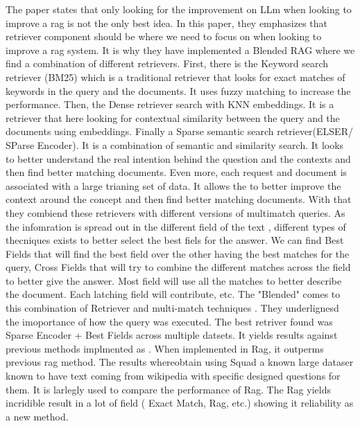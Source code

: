 The paper states that only looking for the improvement on LLm when looking to improve a rag is not the only best idea. In this paper, they emphasizes that retriever component should be where we need to
focus on when looking to improve a rag system. It is why they have implemented a Blended RAG where we find a combination of different retrievers. First, there is the Keyword search retriever (BM25) which 
is a traditional retriever that looks for exact matches of keywords in the query and the documents. It uses fuzzy matching to increase the performance. Then, the Dense retriever search with KNN embeddings. 
It is a retriever that here looking for contextual similarity between the query and the documents using embeddings. Finally a Sparse semantic search retriever(ELSER/ SParse Encoder). It is a combination of
semantic and similarity search. It looks to better understand the real intention behind the question and the contexts and then find better matching documents. Even more, each request and document is associated
with a large trianing set of data. It allows the to better improve the context around the concept and then find better matching documents. With that they combiend these retrievers with different versions of 
multimatch queries. As the infomration is spread out in the different field of the text , different types of thecniques exists to better select the best fiels for the answer. We can find Best Fields that will
find the best field over the other having the best matches for the query, Cross Fields that will try to combine the different matches across the field to better give the answer. Most field will use all the matches
to better describe the document. Each latching field will contribute, etc. The "Blended" comes to this combination of Retriever and multi-match techniques . They underlignesd the imoportance of how the query was executed.
The best retriver found was Sparse Encoder + Best Fields across multiple datsets. It yields results against previous methods implmented as . When implemented in Rag, it outperms previous rag method. The results whereobtain using Squad 
a known large dataser known to have text coming from wikipedia with specific designed questions for them. It is larlegly used to compare the performance of Rag. The Rag yields incridible result in a lot of field ( Exact Match, Rag, etc.)
showing it reliability as a new method.





